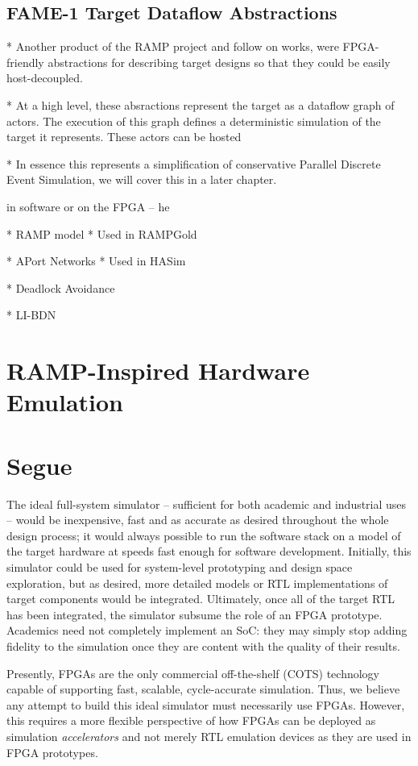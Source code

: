 \subsection{FAME-1 Target Dataflow Abstractions}

* Another product of the RAMP project and follow on works, were FPGA-friendly abstractions 
for describing target designs so that they could be easily host-decoupled.

* At a high level, these absractions represent the target as a dataflow graph of actors. The execution
of this graph defines a deterministic simulation of the target it represents. These actors can be hosted

* In essence this represents a simplification of conservative Parallel Discrete Event
Simulation, we will cover this in a later chapter.


in software or on the FPGA -- he

* RAMP model
  * Used in RAMPGold

* APort Networks
  * Used in HASim

* Deadlock Avoidance

* LI-BDN




\section{RAMP-Inspired Hardware Emulation}


\section{Segue}
The ideal full-system simulator -- sufficient for both academic and industrial
uses -- would be inexpensive, fast and as accurate as desired throughout the
whole design process; it would always possible to run the software stack on a
model of the target hardware at speeds fast enough for software development.
Initially, this simulator could be used for system-level prototyping and design
space exploration, but as desired, more detailed models or RTL implementations
of target components would be integrated. Ultimately, once all of the target
RTL has been integrated, the simulator subsume the role of an FPGA prototype.
Academics need not completely implement an SoC: they may simply stop adding
fidelity to the simulation once they are content with the quality of their
results.

Presently, FPGAs are the only commercial off-the-shelf (COTS) technology
capable of supporting fast, scalable, cycle-accurate simulation. Thus, we
believe any attempt to build this ideal simulator must necessarily use FPGAs.
However, this requires a more flexible perspective of how FPGAs can be deployed as
simulation \emph{accelerators} and not merely RTL emulation devices as they are
used in FPGA prototypes.

